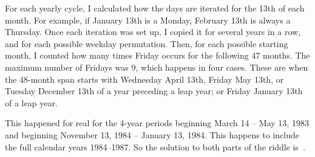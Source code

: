 \documentclass{article}
\begin{document}
For each yearly cycle, I calculated how the days are iterated for the 13th of each month.
For example, if January 13th is a Monday, February 13th is always a Thursday.
Once each iteration was set up, I copied it for several years in a row, and for each possible weekday permutation.
Then, for each possible starting month, I counted how many times Friday occurs for the following 47 months.
The maximum number of Fridays was 9, which happens in four cases.
These are when the 48-month span starts with Wednesday April 13th, Friday May 13th, or Tuesday December 13th of a year preceding a leap year; or Friday January 13th of a leap year.

This happened for real for the 4-year periods beginning March 14 -- May 13, 1983 and beginning November 13, 1984 -- January 13, 1984.
This happens to include the full calendar years 1984--1987.
So the solution to both parts of the riddle is
\,.
\end{document}

